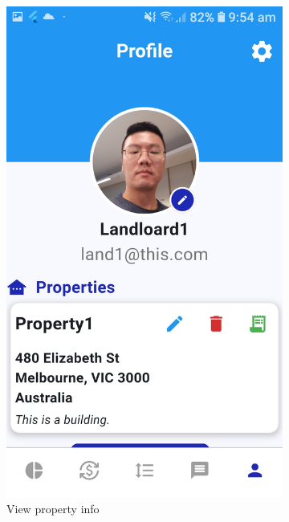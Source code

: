 \documentclass[sigconf,nonacm]{acmart}\settopmatter{printfolios=true}
\begin{document}
\begin{figure}[htbp]
  \centering
  \begin{subfigure}{0.25\textwidth}
    \includegraphics[width=\textwidth]{propertyInfo.jpg}
    \caption{View property info}
    \label{fig:propertyInfo}
  \end{subfigure}
  \begin{subfigure}{0.25\textwidth}

\end{subfigure}
\end{figure}
\end{document}
